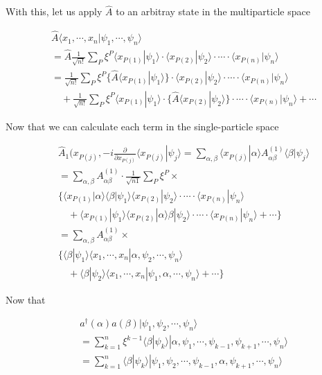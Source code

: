﻿\documentclass[twoside]{book}
\numberwithin{equation}{section}
\begin{document}
With this, let us apply $\hat{A}$ to an arbitray state in the multiparticle space

\[\begin{split}
&\hat{A}\langle x_1,\cdots,x_n|\psi_1,\cdots,\psi_n\rangle \\
&=\hat{A}\frac{1}{\sqrt{n!}}\sum_P\xi^P\langle x_{P(1)}|\psi_1\rangle\cdot\langle x_{P(2)}|\psi_2\rangle\cdot\cdots\cdot\langle x_{P(n)}|\psi_n\rangle\\
&=\frac{1}{\sqrt{n!}}\sum_P\xi^P\{\hat{A}\langle x_{P(1)}|\psi_1\rangle\}\cdot\langle x_{P(2)}|\psi_2\rangle\cdot\cdots\cdot\langle x_{P(n)}|\psi_n\rangle \\
&\quad + \frac{1}{\sqrt{n!}}\sum_P\xi^P\langle x_{P(1)}|\psi_1\rangle\cdot\{\hat{A}\langle x_{P(2)}|\psi_2\rangle\}\cdot\cdots\cdot\langle x_{P(n)}|\psi_n\rangle + \cdots
\end{split}\]

Now that we can calculate each term in the single-particle space

\[\begin{split}
&\hat{A}_1(x_{P(j)},-i\frac{\partial}{\partial x_{P(j)}}\langle x_{P(j)}|\psi_j\rangle = \sum_{\alpha,\beta}\langle x_{P(j)}|\alpha\rangle A^{(1)}_{\alpha\beta}\langle\beta|\psi_j\rangle \\
&= \sum_{\alpha,\beta}A^{(1)}_{\alpha\beta}\cdot\frac{1}{\sqrt{n1}}\sum_P\xi^P \times \\
&\Big\{\langle x_{P(1)}|\alpha\rangle\langle\beta|\psi_1\rangle\langle x_{P(2)}|\psi_2\rangle\cdot\cdots\cdot\langle x_{P(n)}|\psi_n\rangle\\
&\quad +\langle x_{P(1)}|\psi_1\rangle\langle x_{P(2)}|\alpha\rangle\beta|\psi_2\rangle\cdot\cdots\cdot\langle x_{P(n)}|\psi_n\rangle + \cdots\Big\}\\
&=\sum_{\alpha,\beta}A_{\alpha\beta}^{(1)}\times\\
&\Big\{\langle\beta|\psi_1\rangle\langle x_1,\cdots,x_n|\alpha,\psi_2,\cdots,\psi_n\rangle\\
&\quad +\langle\beta|\psi_2\rangle\langle x_1,\cdots,x_n|\psi_1,\alpha,\cdots,\psi_n\rangle + \cdots\Big\}
\end{split}\]

Now that

\[\begin{split}
&a^\dagger(\alpha) a(\beta)|\psi_1,\psi_2,\cdots,\psi_n\rangle \\
&= \sum_{k=1}^n\xi^{k-1}\langle \beta|\psi_k\rangle|\alpha,\psi_1,\cdots,\psi_{k-1},\psi_{k+1},\cdots,\psi_n\rangle\\
&=\sum_{k=1}^n\langle\beta|\psi_k\rangle|\psi_1,\psi_2,\cdots,\psi_{k-1},\alpha,\psi_{k+1},\cdots,\psi_n\rangle
\end{split}\]
\end{document}
